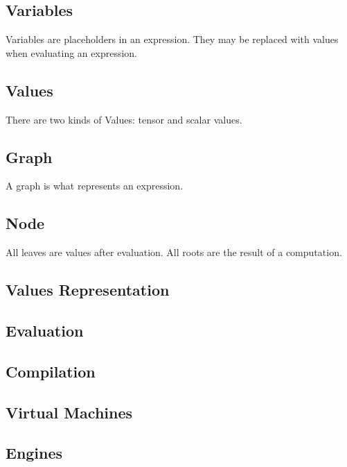 \documentclass{article}
\begin{document}
\subsection{Variables}

Variables are placeholders in an expression. They may be replaced with values when evaluating an expression.

\subsection{Values} \label{subsection:val}

There are two kinds of Values: tensor and scalar values.

\subsection{Graph} \label{subsection:graph}

A graph is what represents an expression.

\subsection{Node}

All leaves are values after evaluation. All roots are the result of a computation.

\subsection{Values Representation}\label{subsection:valrepr}

\subsection{Evaluation} \label{subsection:eval}

\subsection{Compilation}

\subsection{Virtual Machines}

\subsection{Engines}
\end{document}
